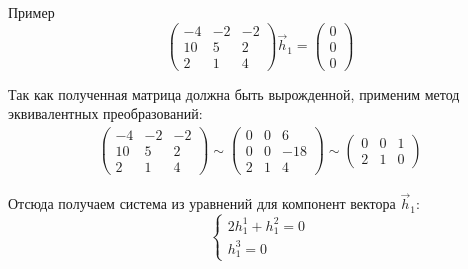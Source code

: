 \documentclass[12pt,twoside]{report}
\theoremstyle{MyNonumberplain}
\begin{document}
\begin{example}{Пример}
    \begin{equation*}
        \left(
            \begin{array}{ccc}
                -4&-2 &-2\\
                10 &5 &2\\
                2 &1 &4
            \end{array}
        \right) \vec{h}_1=\begin{pmatrix}
            0\\ 0\\ 0
        \end{pmatrix}
    \end{equation*}
    
    Так как полученная матрица должна быть вырожденной, применим метод эквивалентных преобразований:
    \begin{eqnarray*}
        \left(
            \begin{array}{ccc}
                -4&-2 &-2\\
                10 &5 &2\\
                2 &1 &4
            \end{array}
        \right) \sim \left(
            \begin{array}{ccc}
                0&0 &6\\
                0 &0 &-18\\
                2 &1 &4
            \end{array} \right) \sim \left(
                \begin{array}{ccc}
                    0 &0 &1\\
                    2 &1 &0
                \end{array}
            \right)
        \end{eqnarray*}

        Отсюда получаем система из уравнений для компонент вектора $\vec{h}_1$:
        \begin{equation*}
            \begin{cases}
                2h_1^1+h_1^2=0\\
                h_1^3=0
            \end{cases}
        \end{equation*}


\end{example}
\end{document}
